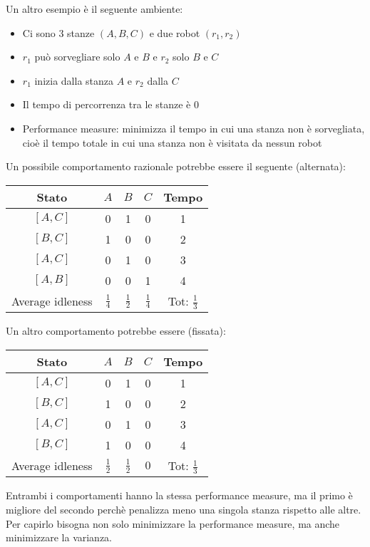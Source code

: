 \documentclass[a4paper]{article}
\begin{document}
\begin{example}
  Un altro esempio è il seguente ambiente:
  \begin{itemize}
    \item Ci sono 3 stanze \( (A,B,C) \) e due robot \( (r_1, r_2) \) 
    \item \( r_1 \) può sorvegliare solo \( A \) e \( B \) e \( r_2 \) solo \( B \) e \( C \)
    \item \( r_1 \) inizia dalla stanza \( A \) e \( r_2 \) dalla \( C \)
    \item Il tempo di percorrenza tra le stanze è 0
    \item Performance measure: minimizza il tempo in cui una stanza non è sorvegliata,
      cioè il tempo totale in cui una stanza non è visitata da nessun robot
  \end{itemize}

  Un possibile comportamento razionale potrebbe essere il seguente (alternata):
  \begin{table}[H]
    \centering
    \begin{tabular}{|c|c|c||c|c|}
      \hline
      Stato & \( A \) & \( B \) & \( C \) & Tempo  \\
      \hline
      \( [A, C] \) & 0 & 1 & 0 & 1 \\
      \( [B, C] \) & 1 & 0 & 0 & 2 \\
      \( [A, C] \) & 0 & 1 & 0 & 3 \\
      \( [A, B] \) & 0 & 0 & 1 & 4 \\
      \hline
      Average idleness & \( \frac{1}{4} \)  & \( \frac{1}{2} \)  & \( \frac{1}{4} \)  & Tot: \( \frac{1}{3} \)  \\
      \hline
    \end{tabular}
  \end{table}
  \noindent
  Un altro comportamento potrebbe essere (fissata):
  \begin{table}[H]
    \centering
    \begin{tabular}{|c|c|c||c|c|}
      \hline
      Stato & \( A \) & \( B \) & \( C \) & Tempo  \\
      \hline
      \( [A, C] \) & 0 & 1 & 0 & 1 \\
      \( [B, C] \) & 1 & 0 & 0 & 2 \\
      \( [A, C] \) & 0 & 1 & 0 & 3 \\
      \( [B, C] \) & 1 & 0 & 0 & 4 \\
      \hline
      Average idleness & \( \frac{1}{2} \)  & \( \frac{1}{2} \)  & \( 0 \)  & Tot: \( \frac{1}{3} \)  \\
      \hline
    \end{tabular}
  \end{table}
  \noindent
  Entrambi i comportamenti hanno la stessa performance measure, ma il primo è migliore
  del secondo perchè penalizza meno una singola stanza rispetto alle altre. Per capirlo
  bisogna non solo minimizzare la performance measure, ma anche minimizzare la varianza.
\end{example}
\end{document}
